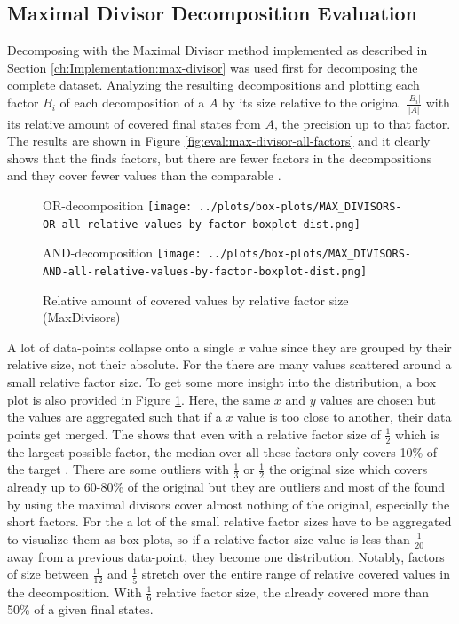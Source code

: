 \subsection{Maximal Divisor Decomposition Evaluation}
\label{ch:Evaluation:decomposition-quality:max-divisor}
Decomposing with the Maximal Divisor method implemented as described in Section \ref{ch:Implementation:max-divisor} was used first for decomposing the complete dataset.
Analyzing the resulting decompositions and plotting each factor $B_i$ of each decomposition of a \DFA $A$ by its size relative to the original $\frac{|B_i|}{|A|}$ with its relative amount of covered final states from $A$, the precision up to that factor.
The results are shown in Figure \ref{fig:eval:max-divisor-all-factors} and it clearly shows that the \orDecomp finds factors, but there are fewer factors in the decompositions and they cover fewer values than the comparable \andDecomp.
\begin{figure}[h]
	\begin{minipage}[h]{0.49\linewidth}
		\centering
		OR-decomposition
		\texttt{[image: ../plots/box-plots/MAX\_DIVISORS-OR-all-relative-values-by-factor-boxplot-dist.png]}
	\end{minipage}
	\begin{minipage}[h]{0.49\linewidth}
		\centering
		AND-decomposition
		\texttt{[image: ../plots/box-plots/MAX\_DIVISORS-AND-all-relative-values-by-factor-boxplot-dist.png]}
	\end{minipage}
	\caption{Relative amount of covered values by relative factor size (MaxDivisors)}
	\label{fig:eval:max-divisor-all-factors-box-plot}
\end{figure}
A lot of data-points collapse onto a single $x$ value since they are grouped by their relative size, not their absolute.
For the \andDecomp there are many values scattered around a small relative factor size.
To get some more insight into the distribution, a box plot is also provided in Figure \ref{fig:eval:max-divisor-all-factors-box-plot}.
Here, the same $x$ and $y$ values are chosen but the values are aggregated such that if a $x$ value is too close to another, their data points get merged.
The \orDecomp shows that even with a relative factor size of $\frac{1}{2}$ which is the largest possible factor, the median over all these factors only covers 10\% of the target \DFA.
There are some outliers with $\frac{1}{3}$ or $\frac{1}{2}$ the original size which covers already up to 60-80\% of the original \DFA but they are outliers and most of the \orDecomp found by using the maximal divisors cover almost nothing of the original, especially the short factors.
For the \andDecomp a lot of the small relative factor sizes have to be aggregated to visualize them as box-plots, so if a relative factor size value is less than $\frac{1}{20}$ away from a previous data-point, they become one distribution.
Notably, factors of size between $\frac{1}{12}$ and $\frac{1}{5}$ stretch over the entire range of relative covered values in the decomposition. With $\frac{1}{6}$ relative factor size, the \andDecomp already covered more than 50\% of a given \DFAs final states.


